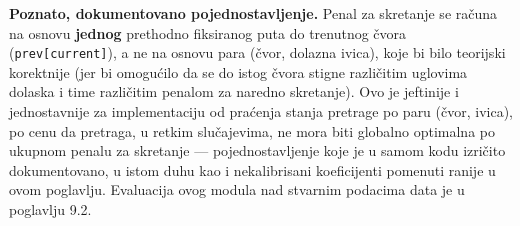\textbf{Poznato, dokumentovano pojednostavljenje.} Penal za skretanje se računa na osnovu \textbf{jednog} prethodno fiksiranog puta do trenutnog čvora (\texttt{prev[current]}), a ne na osnovu para (čvor, dolazna ivica), koje bi bilo teorijski korektnije (jer bi omogućilo da se do istog čvora stigne različitim uglovima dolaska i time različitim penalom za naredno skretanje). Ovo je jeftinije i jednostavnije za implementaciju od praćenja stanja pretrage po paru (čvor, ivica), po cenu da pretraga, u retkim slučajevima, ne mora biti globalno optimalna po ukupnom penalu za skretanje — pojednostavljenje koje je u samom kodu izričito dokumentovano, u istom duhu kao i nekalibrisani koeficijenti pomenuti ranije u ovom poglavlju. Evaluacija ovog modula nad stvarnim podacima data je u poglavlju 9.2.

\clearpage

